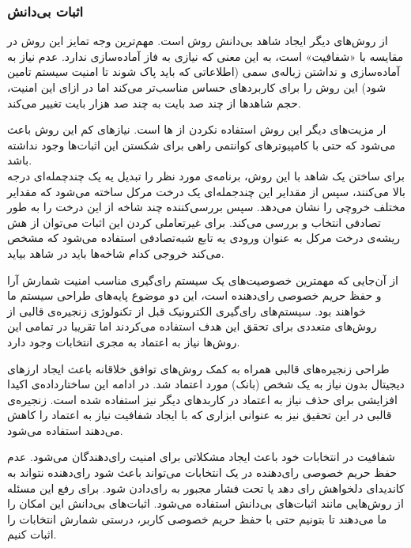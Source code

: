 \subsubsection{اثبات بی‌دانش }
از روش‌های دیگر ایجاد شاهد بی‌دانش روش 
\cite{zkstark}
است. مهم‌ترین وجه تمایز این روش در مقایسه با
 «شفافیت»
است، به این معنی که نیازی به فاز آماده‌سازی ندارد. عدم نیاز به آماده‌سازی و نداشتن زباله‌ی سمی (اطلاعاتی که باید پاک شوند تا امنیت سیستم تامین شود) این روش را برای کاربرد‌های حساس مناسب‌تر می‌کند اما در ازای این امنیت، حجم شاهد‌ها از چند صد بایت به چند صد هزار بایت تغییر می‌کند.
\par
ار مزیت‌های دیگر این روش استفاده نکردن از 
ها
است. نیاز‌های کم این روش باعث می‌شود که حتی با کامپیوتر‌های کوانتمی
 راهی برای شکستن این اثبات‌ها وجود نداشته باشد.
\\
برای ساختن یک شاهد با این روش، برنامه‌ی مورد نظر را تبدیل یه یک چندچمله‌ای درجه بالا می‌کنند، سپس از مقدایر این چندجمله‌ای یک درخت مرکل ساخته می‌شود که مقدایر مختلف خروچی را نشان می‌دهد. سپس بررسی‌کننده چند شاخه از این درخت را به طور تصادفی انتخاب و بررسی می‌کند. برای غیرتعاملی کردن این اثبات می‌توان از هش ریشه‌ی درخت مرکل به عنوان ورودی یه تابع شبه‌تصادفی
استفاده می‌شود که مشخص می‌کند خروجی کدام شاخه‌ها باید در شاهد بیاید. 






از آن‌جایی که مهمترین خصوصیت‌های یک سیستم رای‌گیری مناسب امنیت شمارش آرا و حفظ حریم خصوصی رای‌دهنده است، این دو موضوع پایه‌های طراحی سیستم ما خواهند بود. سیستم‌های رای‌گیری الکترونیک قبل از تکنولوژی زنجیره‌ی قالبی از روش‌های متعددی برای تحقق این هدف استفاده می‌کردند اما تقریبا در تمامی این روش‌ها نیاز به اعتماد به مجری انتخابات وجود دارد. 
\par
طراحی زنجیره‌های قالبی همراه به کمک روش‌های توافق خلاقانه باعث ایجاد ارز‌های دیجیتال بدون نیاز به یک شخص (بانک) مورد اعتماد شد. در ادامه این ساختارداده‌ی اکیدا افزایشی برای حذف نیاز به اعتماد در کاربدهای دیگر نیز استفاده شده است. زنجیره‌ی قالبی در این تحقیق نیز به عنوانی ابزاری که با ایجاد شفافیت نیاز به اعتماد را کاهش می‌دهند استفاده می‌شود.
\par 
شفافیت در انتخابات خود باعث ایجاد مشکلاتی برای امنیت رای‌دهندگان می‌شود. عدم حفظ حریم خصوصی رای‌دهنده در یک انتخابات می‌تواند باعث شود رای‌دهنده نتواند به کاندیدای دلخواهش رای دهد یا تحت فشار مجبور به رای‌دادن شود. برای رفع این مسئله از روش‌هایی مانند اثبات‌های بی‌دانش استفاده می‌شود. اثبات‌های بی‌دانش این امکان را ما می‌دهند تا بتونیم حتی با حفظ حریم خصوصی کاربر، درستی شمارش انتخابات را اثبات کنیم.


